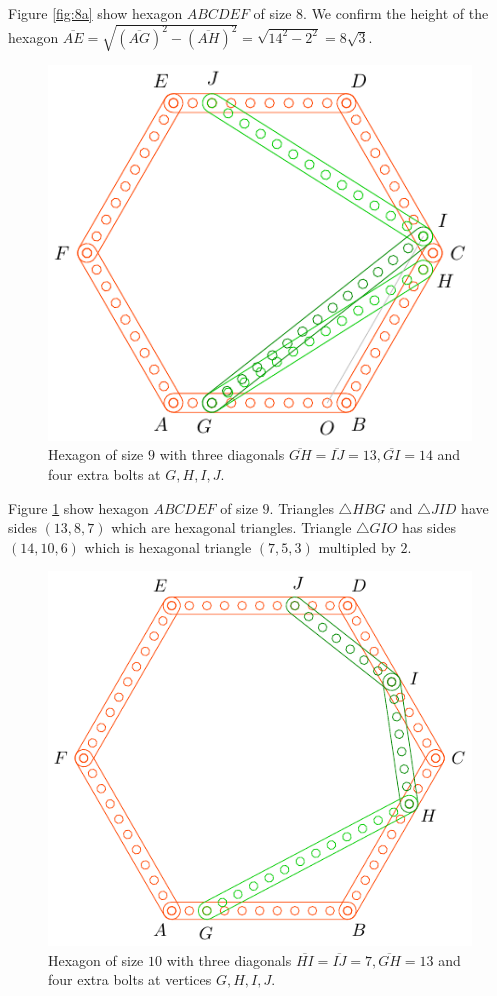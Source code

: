 \documentclass[11pt]{article}
\begin{document}
Figure \ref{fig:8a} show hexagon $ABCDEF$ of size $8$. We confirm the height of the hexagon $\overline{AE} = \sqrt{(\overline{AG})^2 - (\overline{AH})^2} = \sqrt{14^2 - 2^2} = 8\sqrt3$.


\begin{figure}[H]
\centering
\includegraphics[scale=1]{9/hexa-9a}
\caption{Hexagon of size $9$ with three diagonals $\overline{GH} = \overline{IJ} = 13, \overline{GI} = 14$ and four extra bolts at $G,H,I,J$.}
\label{fig:9a}
\end{figure}

Figure \ref{fig:9a} show hexagon $ABCDEF$ of size $9$. Triangles $\triangle{HBG}$ and $\triangle{JID}$ have sides $(13,8,7)$ which are hexagonal triangles. Triangle $\triangle{GIO}$ has sides $(14,10,6)$ which is hexagonal triangle $(7,5,3)$ multipled by $2$.


\begin{figure}[H]
\centering
\includegraphics[scale=1]{10/hexa-10a}
\caption{Hexagon of size $10$ with three diagonals $\overline{HI} = \overline{IJ} = 7, \overline{GH} = 13$ and four extra bolts at vertices $G,H,I,J$.}
\label{fig:10a}
\end{figure}
\end{document}
